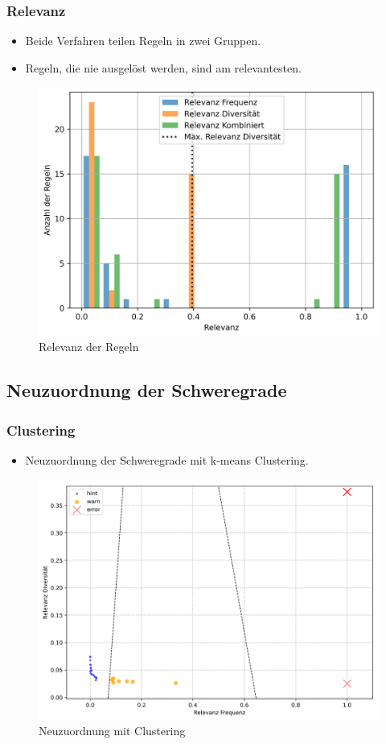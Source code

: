 \begin{frame}
  \frametitle{Relevanz}
  \vspace{-0.4cm}
  \begin{itemize}
    \item Beide Verfahren teilen Regeln in zwei Gruppen.
    \item Regeln, die nie ausgelöst  werden, sind am relevantesten.
  \end{itemize}
  \begin{figure}[htbp]
    \centering
    \includegraphics[width=0.72\linewidth]{img/defense-priodistrhist.png}
    \caption{Relevanz der Regeln}
    \label{fig:histogram}
  \end{figure}
\end{frame}

\subsection{Neuzuordnung der Schweregrade}
\begin{frame}
  \frametitle{Clustering}
  \vspace{-0.4cm}
  \begin{itemize}
    \item Neuzuordnung der Schweregrade mit k-means Clustering.
  \end{itemize}
  \begin{figure}[htbp]
    \centering
    \includegraphics[width=0.82\linewidth]{img/defense-clusterprioscatter.png}
    \caption{Neuzuordnung mit Clustering}
    \label{fig:clustering}
  \end{figure}
\end{frame}

